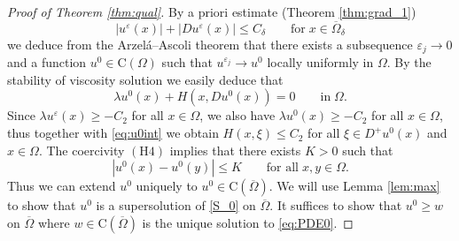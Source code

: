 \documentclass[11pt,reqno]{amsart}
\numberwithin{figure}{section}
\theoremstyle{plain}
\theoremstyle{remark}
\numberwithin{equation}{section}
\newcommand{\rmC}{\mathrm{C}}
\begin{document}
\begin{proof}[Proof of Theorem \ref{thm:qual}] By a priori estimate (Theorem \ref{thm:grad_1})
\begin{equation}\label{e:priorie_eps}
    |u^\varepsilon(x)| + |Du^\varepsilon(x)| \leq C_\delta \qquad\text{for}\;x\in \overline{\Omega}_\delta
\end{equation}
we deduce from the Arzel\'a--Ascoli theorem that there exists a subsequence $\varepsilon_j\to 0$ and a function $u^0\in \rmC(\Omega)$ such that $u^{\varepsilon_j}\to u^0$ locally uniformly in $\Omega$. By the stability of viscosity solution we easily deduce that 
\begin{equation}\label{eq:u0int}
   \lambda u^0(x) + H(x,Du^0(x)) = 0 \qquad\text{in}\;\Omega.
\end{equation}
Since $\lambda u^\varepsilon(x)\geq -C_2$ for all $x\in \Omega$, we also have $\lambda u^0(x)\geq -C_2$ for all $x\in \Omega$, thus together with \eqref{eq:u0int} we obtain $H(x,\xi) \leq C_2$ for all $\xi\in D^+u^0(x)$ and $x\in \Omega$. The coercivity $\mathrm{(H4)}$ implies that there exists $K>0$ such that 
\begin{equation*}
    |u^0(x) - u^0(y)| \leq K \qquad\text{for all}\;x,y\in \Omega.
\end{equation*}
Thus we can extend $u^0$ uniquely to $u^0\in \rmC(\overline{\Omega})$. We will use Lemma \ref{lem:max} to show that $u^0$ is a supersolution of \eqref{S_0} on $\overline{\Omega}$. It suffices to show that $u^0\geq w$ on $\overline{\Omega}$ where $w\in \rmC(\overline{\Omega})$ is the unique solution to \eqref{eq:PDE0}.


\end{proof}
\end{document}
